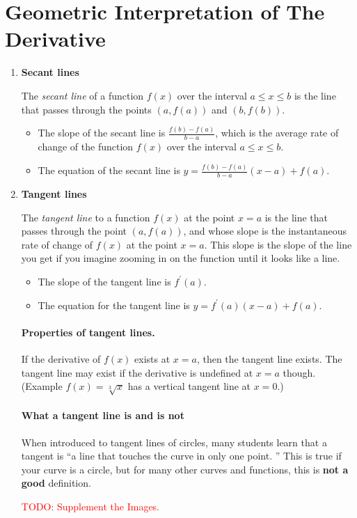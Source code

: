 \section{Geometric Interpretation of The Derivative}
\begin{enumerate}
    \item \textbf{Secant lines}

        The \textit{secant line} of a function $f(x)$ over the interval $a\leq x\leq b$ is the line that passes through the points $(a,f(a))$ and $(b,f(b))$.
        \begin{itemize}
            \item The slope of the secant line is $\frac{f(b)-f(a)}{b-a}$, which is the average rate of change of the function $f(x)$ over the interval $a\leq x\leq b$.
            \item The equation of the secant line is $y=\frac{f(b)-f(a)}{b-a}(x-a)+f(a)$.
        \end{itemize}
    \item \textbf{Tangent lines}

        The \textit{tangent line} to a function $f(x)$ at the point $x=a$ is the line that passes through the point $(a,f(a))$, and whose slope is the instantaneous rate of change of $f(x)$ at the point $x=a$. This slope is the slope of the line you get if you imagine zooming in on the function until it looks like a line.
        \begin{itemize}
            \item The slope of the tangent line is $f^\prime(a)$.
            \item The equation for the tangent line is $y=f^\prime(a)(x-a)+f(a)$.
        \end{itemize}
        \paragraph{Properties of tangent lines.\\} If the derivative of $f(x)$ exists at $x=a$, then the tangent line exists. The tangent line may exist if the derivative is undefined at $x=a$ though. (Example $f(x)=\sqrt[3]{x}$ has a vertical tangent line at $x=0$.)
        \paragraph{What a tangent line is and is not\\} When introduced to tangent lines of circles, many students learn that a tangent is ``a line that touches the curve in only one point. '' This is true if your curve is a circle, but for many other curves and functions, this is \textbf{not a good} definition.

        \textcolor{red}{TODO: Supplement the Images.}
\end{enumerate}
